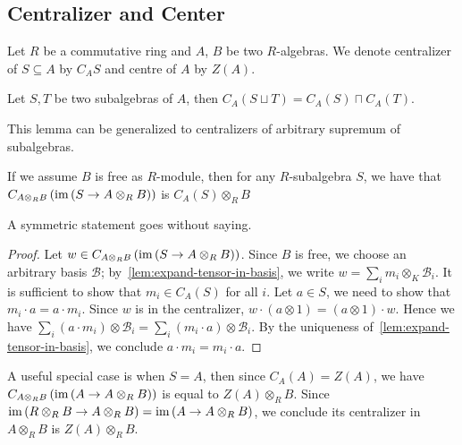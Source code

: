 \subsection{Centralizer and Center}
Let $R$ be a commutative ring and $A$, $B$ be two $R$-algebras. We denote
centralizer of $S\subseteq A$ by $C_{A}S$ and centre of $A$ by $Z(A)$.

\begin{lemma}\label{lem:sup-centralizer}
  Let $S, T$ be two subalgebras of $A$, then
  $C_{A}(S\sqcup T)=C_{A}(S)\sqcap C_{A}(T)$. \leanok
\end{lemma}
This lemma can be generalized to centralizers of arbitrary supremum of
subalgebras.

\begin{lemma}
  If we assume $B$ is free as $R$-module, then for any $R$-subalgebra $S$, we
  have that $C_{A\otimes_{R}B}\left(\operatorname{im}\left(S\to A\otimes_{R}B\right)\right)$
  is $C_{A}(S) \otimes_{R} B$
\end{lemma}
A symmetric statement goes without saying.
\begin{proof}
  Let $w\in C_{A\otimes_{R}B}\left(\operatorname{im}\left(S\to A\otimes_{R}B\right)\right)$.
  Since $B$ is free, we choose an arbitrary basis $\mathcal{B}$;
  by~\cref{lem:expand-tensor-in-basis}, we write
  $w = \sum_{i}m_{i}\otimes_{K}\mathcal{B}_{i}$. It is sufficient to show that
  $m_{i}\in C_{A}(S)$ for all $i$. Let $a \in S$, we need to show that
  $m_{i}\cdot a = a \cdot m_{i}$. Since $w$ is in the centralizer,
  $w \cdot (a\otimes 1) = (a\otimes 1)\cdot w$. Hence we have
  $\sum_{i}(a\cdot m_{i})\otimes\mathcal{B}_{i}=\sum_{i}(m_{i}\cdot a)\otimes\mathcal{B}_{i}$.
  By the uniqueness of~\cref{lem:expand-tensor-in-basis}, we conclude
  $a\cdot m_{i}=m_{i}\cdot a$.
\end{proof}

\begin{remark}
  A useful special case is when $S=A$, then since $C_{A}(A)=Z(A)$, we have
  $C_{A\otimes_{R}B}\left(\operatorname{im}\left(A\to A\otimes_{R} B\right)\right)$ is equal
  to $Z(A)\otimes_{R} B$. Since
  $\operatorname{im}\left(R\otimes_{R}B\to A\otimes_{R}B\right)=\operatorname{im}\left(A\to A\otimes_{R}B\right)$,
  we conclude its centralizer in $A\otimes_{R}B$ is $Z(A)\otimes_{R}B$.
\end{remark}

